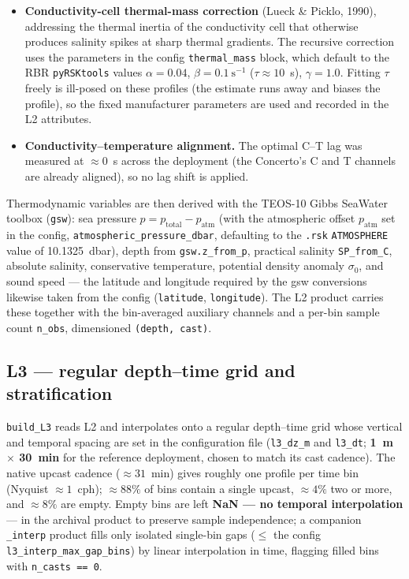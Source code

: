 \documentclass[11pt]{article}
\newcommand{\code}[1]{\texttt{#1}}
\begin{document}
\begin{itemize}
\item \textbf{Conductivity-cell thermal-mass correction} (Lueck \& Picklo, 1990), addressing
the thermal inertia of the conductivity cell that otherwise produces salinity spikes at sharp
thermal gradients. The recursive correction uses the parameters in the config \code{thermal\_mass} block, which
default to the RBR \code{pyRSKtools} values $\alpha = 0.04$, $\beta = 0.1~\mathrm{s^{-1}}$
($\tau \approx 10$~s), $\gamma = 1.0$. Fitting
$\tau$ freely is ill-posed on these profiles (the estimate runs away and biases the profile),
so the fixed manufacturer parameters are used and recorded in the L2 attributes.

\item \textbf{Conductivity--temperature alignment.} The optimal C--T lag was measured at
$\approx 0$~s across the deployment (the Concerto's C and T channels are already aligned), so
no lag shift is applied.
\end{itemize}

Thermodynamic variables are then derived with the TEOS-10 Gibbs SeaWater toolbox
(\code{gsw}): sea pressure $p = p_{\mathrm{total}} - p_{\mathrm{atm}}$ (with the atmospheric
offset $p_{\mathrm{atm}}$ set in the config, \code{atmospheric\_pressure\_dbar}, defaulting to
the \code{.rsk} \code{ATMOSPHERE} value of 10.1325~dbar), depth from \code{gsw.z\_from\_p},
practical salinity \code{SP\_from\_C}, absolute salinity, conservative temperature, potential
density anomaly $\sigma_0$, and sound speed --- the latitude and longitude required by the gsw
conversions likewise taken from the config (\code{latitude}, \code{longitude}). The L2 product carries
these together with the bin-averaged auxiliary channels and a per-bin sample count
\code{n\_obs}, dimensioned \code{(depth, cast)}.

\subsection{L3 --- regular depth--time grid and stratification}

\code{build\_L3} reads L2 and interpolates onto a regular depth--time grid whose vertical and
temporal spacing are set in the configuration file (\code{l3\_dz\_m} and \code{l3\_dt};
\textbf{1~m $\times$ 30~min} for the reference deployment, chosen to match its cast cadence). The native upcast cadence ($\approx 31$~min) gives roughly one profile per
time bin (Nyquist $\approx 1$~cph); $\approx 88\%$ of bins contain a single upcast,
$\approx 4\%$ two or more, and $\approx 8\%$ are empty. Empty bins are left \textbf{NaN --- no
temporal interpolation} --- in the archival product to preserve sample independence; a
companion \code{\_interp} product fills only isolated single-bin gaps
($\le$ the config \code{l3\_interp\_max\_gap\_bins}) by linear interpolation in time, flagging filled bins with
\code{n\_casts == 0}.
\end{document}
